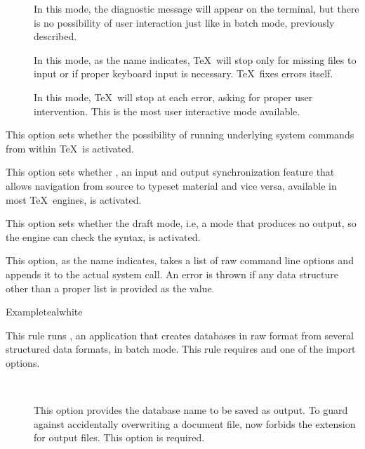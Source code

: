 \begin{description}
\begin{description}
\begin{description}
\item[] In this mode, the diagnostic message will appear on the terminal, but there is no possibility of user interaction just like in batch mode, previously described.

\item[] In this mode, as the name indicates, \TeX\ will stop only for missing files to input or if proper keyboard input is necessary. \TeX\ fixes errors itself.

\item[] In this mode, \TeX\ will stop at each error, asking for proper user intervention. This is the most user interactive mode available.
\end{description}

\item[\rpsbox{shell}] This option sets whether the possibility of running underlying system commands from within \TeX\ is activated.

\item[\rpsbox{synctex}] This option sets whether , an input and output synchronization feature that allows navigation from source to typeset material and vice versa, available in most \TeX\ engines, is activated.

\item[\rpsbox{draft}] This option sets whether the draft mode, i.e, a mode that produces no output, so the engine can check the syntax, is activated.

\item[\abox{options}] This option, as the name indicates, takes a list of raw command line options and appends it to the actual system call. An error is thrown if any data structure other than a proper list is provided as the value.
\end{description}

\begin{codebox}{Example}{teal}{\icnote}{white}
\end{codebox}

\item[\rulebox{datatooltk}{Nicola Talbot, Paulo Cereda}] This rule runs , an application that creates  databases in raw format from several structured data formats, in batch mode. This rule requires  and one of the import options.

\begin{description}
\item[~\rqbox] This option provides the database name to be saved as output. To guard against accidentally overwriting a document file,  now forbids the  extension for output files. This option is required.


\end{description}
\end{description}
